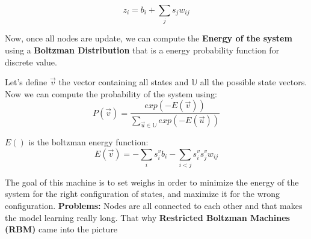  \begin{equation}
 z_i = b_i + \sum_{j} s_j w_{ij}
 \end{equation}
 
 Now, once all nodes are update, we can compute the \textbf{Energy of the system} using a \textbf{Boltzman Distribution} that is a energy probability function for discrete value.
 
 Let's define $\vec{v}$ the vector containing all states and $\mathbb{U}$ all the possible state vectors. Now we can compute the probability of the system using:
 \begin{equation}
 P(\vec{v}) = \frac{exp(-E(\vec{v}))}{\sum_{\vec{u}\in\mathbb{U}} exp(-E(\vec{u}))}
 \end{equation}

$E()$ is the boltzman energy function:
\begin{equation}
E(\vec{v}) = - \sum_i s_i^v b_i - \sum_{i < j} s_i^v s_j^v w_{ij}
\end{equation}

The goal of this machine is to set weighs in order to minimize the energy of the system for the right configuration of states, and maximize it for the wrong configuration.
\textbf{Problems:} Nodes are all connected to each other and that makes the model learning really long. That why \textbf{Restricted Boltzman Machines (RBM)} came into the picture

